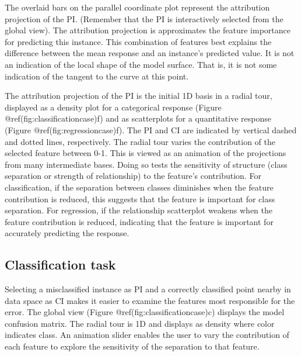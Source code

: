 \documentclass[
]{article}
\begin{document}
The overlaid bars on the parallel coordinate plot represent the
attribution projection of the PI. (Remember that the PI is interactively
selected from the global view). The attribution projection is
approximates the feature importance for predicting this instance. This
combination of features best explains the difference between the mean
response and an instance's predicted value. It is not an indication of
the local shape of the model surface. That is, it is not some indication
of the tangent to the curve at this point.

The attribution projection of the PI is the initial 1D basis in a radial
tour, displayed as a density plot for a categorical response (Figure
@ref(fig:classificationcase)f) and as scatterplots for a quantitative
response (Figure @ref(fig:regressioncase)f). The PI and CI are indicated
by vertical dashed and dotted lines, respectively. The radial tour
varies the contribution of the selected feature between 0-1. This is
viewed as an animation of the projections from many intermediate bases.
Doing so tests the sensitivity of structure (class separation or
strength of relationship) to the feature's contribution. For
classification, if the separation between classes diminishes when the
feature contribution is reduced, this suggests that the feature is
important for class separation. For regression, if the relationship
scatterplot weakens when the feature contribution is reduced, indicating
that the feature is important for accurately predicting the response.

\hypertarget{classification-task}{%
\subsection{Classification task}\label{classification-task}}

Selecting a misclassified instance as PI and a correctly classified
point nearby in data space as CI makes it easier to examine the features
most responsible for the error. The global view (Figure
@ref(fig:classificationcase)c) displays the model confusion matrix. The
radial tour is 1D and displays as density where color indicates class.
An animation slider enables the user to vary the contribution of each
feature to explore the sensitivity of the separation to that feature.
\end{document}
